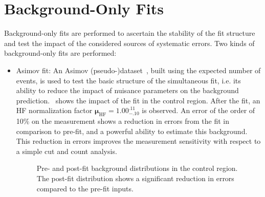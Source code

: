 \section{Background-Only Fits}
Background-only fits are performed to ascertain the stability of the fit structure and test the impact of the considered sources of systematic errors. Two kinds of background-only fits are performed:

\begin{itemize}
    \item Asimov fit: An Asimov (pseudo-)dataset~\cite{Cowan:2010js}, built using the expected number of events, is used to test the basic structure of the simultaneous fit, i.e. its ability to reduce the impact of nuisance parameters on the background prediction.~ shows the impact of the fit in the \uuu control region. After the fit, an HF normalization factor $\mathbf{\mu_\mathrm{HF}=1.00^{.11}_{-.10}}$ is observed. An error of the order of 10\% on the measurement shows a reduction in errors from the fit in comparison to pre-fit, and a powerful ability to estimate this background. This reduction in errors improves the measurement sensitivity with respect to a simple cut and count analysis.

    \begin{figure}[!ht]
        \centering
        \caption{Pre- and post-fit background distributions in the \uuu control region. The post-fit distribution shows a significant reduction in errors compared to the pre-fit inputs.}
        \label{fig:asimov_pre_post}
    \end{figure}


\end{itemize}
